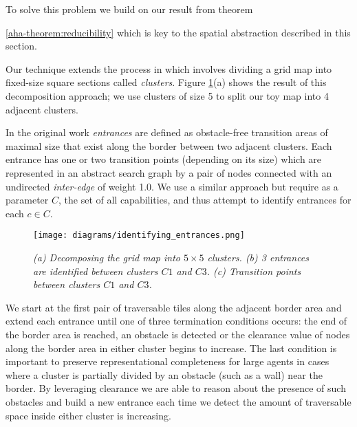 To solve this problem we build on our result from theorem {\ref{aha-theorem:reducibility} which is key to the spatial abstraction described in this section.
\par \indent
Our technique extends the process in \cite{botea04} which involves dividing a grid map into fixed-size square sections called \emph{clusters}. 
Figure \ref{aha-fig:clustersandentrances}(a) shows the result of this decomposition approach; we use clusters of size 5 to split our toy map into 4 adjacent clusters. 
\par \indent
In the original work \emph{entrances} are defined as obstacle-free transition areas of maximal size that exist along the border between two adjacent clusters.
Each entrance has one or two transition points (depending on its size) which are represented in an abstract search graph by a pair of nodes connected with an undirected \emph{inter-edge} of weight 1.0. 
We use a similar approach but require as a parameter $C$, the set of all capabilities, and thus attempt to identify entrances for each $c \in C$. 
\begin{figure}[htbp]
	\vspace{-9pt}
        \caption{\emph{(a) Decomposing the grid map into $5 \times 5$ clusters. (b) 3 entrances are identified between clusters $C1$ and $C3$. (c) Transition points between clusters $C1$ and $C3$.} \vspace{0.5em} }
        \begin{center}
                        \texttt{[image: diagrams/identifying\_entrances.png]}
        \end{center}
        \label{aha-fig:clustersandentrances}
	\vspace{-9pt}
\end{figure}
\par \indent
We start at the first pair of traversable tiles along the adjacent border area and extend each entrance until one of three termination conditions occurs: the end of the border area is reached, an obstacle is detected or the clearance value of nodes along the border area in either cluster begins to increase. 
The last condition is important to preserve representational completeness for large agents in cases where a cluster is partially divided by an obstacle (such as a wall) near the border.
By leveraging clearance we are able to reason about the presence of such obstacles and build a new entrance each time we detect the amount of traversable space inside either cluster is increasing.
\par \indent
}
